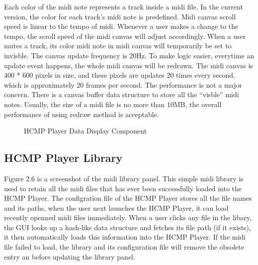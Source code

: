 Each color of the midi note represents a track inside 
a midi file. In the current version, the color for each track's midi note is predefined. 
Midi canvas scroll speed is linear to the tempo of midi. Whenever a user 
makes a change to the tempo, the scroll speed of the midi canvas will adjust
accordingly. When a user mutes a
track, its color midi note in midi canvas will temporarily be set to invisble. 
The canvas
update frequency is 20Hz. To make logic easier, everytime an update event 
happens, the whole midi canvas will be redrawn. The midi canvas is 400 * 600 pixels 
in size, and these pixels are updates 20 times every second, which is approximately 
20 frames per second. The performance is not
a major concern. There is a canvas buffer data 
structure to store all the ``visble'' midi notes. 
Usually, the size of a midi file is no more than 10MB, the overall performance of 
using redraw method is acceptable.

\begin{figure}[H]
\caption{HCMP Player Data Display Component}
\label{fig:speciation}
\end{figure}

\subsection{HCMP Player Library}

Figure 2.6 is a screenshot of the midi library panel. This simple midi library is 
used to retain all the midi files that has ever been successfully loaded into the HCMP Player. 
The configration file of the HCMP Player stores all the file names and its paths, 
when the user next launches the HCMP Player, it can load
recently openned midi files immediately. When a user clicks any file in the libary, 
the GUI looks up a hash-like data structure and fetches its file path (if it exists),
it then automatically
loads this information into the HCMP Player. If the midi file failed to load, the library and its
configuration file will remove the obsolete entry an before updating the library panel.

